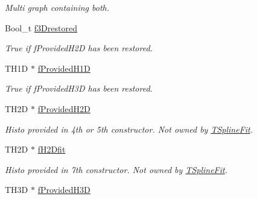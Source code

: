 \begin{DoxyCompactItemize}
\begin{DoxyCompactList}\small\item\em Multi graph containing both. \item\end{DoxyCompactList}\item 
\hypertarget{classTSplineFit_a499b4317bff4ed66c443007ec5ababc8}{
Bool\_\-t \hyperlink{classTSplineFit_a499b4317bff4ed66c443007ec5ababc8}{f3Drestored}}
\label{classTSplineFit_a499b4317bff4ed66c443007ec5ababc8}

\begin{DoxyCompactList}\small\item\em True if fProvidedH2D has been restored. \item\end{DoxyCompactList}\item 
\hypertarget{classTSplineFit_a081dc82b0c3e22b95df72475300ad114}{
TH1D $\ast$ \hyperlink{classTSplineFit_a081dc82b0c3e22b95df72475300ad114}{fProvidedH1D}}
\label{classTSplineFit_a081dc82b0c3e22b95df72475300ad114}

\begin{DoxyCompactList}\small\item\em True if fProvidedH3D has been restored. \item\end{DoxyCompactList}\item 
\hypertarget{classTSplineFit_ad6a68e5a2bc8a75cf4edcadb8e0553aa}{
TH2D $\ast$ \hyperlink{classTSplineFit_ad6a68e5a2bc8a75cf4edcadb8e0553aa}{fProvidedH2D}}
\label{classTSplineFit_ad6a68e5a2bc8a75cf4edcadb8e0553aa}

\begin{DoxyCompactList}\small\item\em Histo provided in 4th or 5th constructor. Not owned by \hyperlink{classTSplineFit}{TSplineFit}. \item\end{DoxyCompactList}\item 
\hypertarget{classTSplineFit_a81c9a7443a935589ce5c61d28d13ed72}{
TH2D $\ast$ \hyperlink{classTSplineFit_a81c9a7443a935589ce5c61d28d13ed72}{fH2Dfit}}
\label{classTSplineFit_a81c9a7443a935589ce5c61d28d13ed72}

\begin{DoxyCompactList}\small\item\em Histo provided in 7th constructor. Not owned by \hyperlink{classTSplineFit}{TSplineFit}. \item\end{DoxyCompactList}\item 
\hypertarget{classTSplineFit_a5673341cfcd1f47b6beedd494f07c0c4}{
TH3D $\ast$ \hyperlink{classTSplineFit_a5673341cfcd1f47b6beedd494f07c0c4}{fProvidedH3D}}
\label{classTSplineFit_a5673341cfcd1f47b6beedd494f07c0c4}


\end{DoxyCompactItemize}
